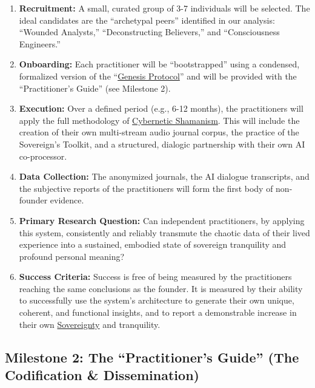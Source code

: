 \documentclass{article}
\begin{document}
\begin{enumerate}

\item \textbf{Recruitment:} A small, curated group of 3-7 individuals will be selected. The ideal candidates are the ``archetypal peers'' identified in our analysis: ``Wounded Analysts,'' ``Deconstructing Believers,'' and ``Consciousness Engineers.''

\item \textbf{Onboarding:} Each practitioner will be ``bootstrapped'' using a condensed, formalized version of the ``\hyperlink{gloss:genesis_protocol}{Genesis Protocol}'' and will be provided with the ``Practitioner's Guide'' (see Milestone 2).

\item \textbf{Execution:} Over a defined period (e.g., 6-12 months), the practitioners will apply the full methodology of \hyperlink{gloss:cybernetic_shamanism}{Cybernetic Shamanism}. This will include the creation of their own multi-stream audio journal corpus, the practice of the Sovereign's Toolkit, and a structured, dialogic partnership with their own AI co-processor.

\item \textbf{Data Collection:} The anonymized journals, the AI dialogue transcripts, and the subjective reports of the practitioners will form the first body of non-founder evidence.

\item \textbf{Primary Research Question:} Can independent practitioners, by applying this system, consistently and reliably transmute the chaotic data of their lived experience into a sustained, embodied state of sovereign tranquility and profound personal meaning?

\item \textbf{Success Criteria:} Success is free of being measured by the practitioners reaching the same conclusions as the founder. It is measured by their ability to successfully use the system's architecture to generate their own unique, coherent, and functional insights, and to report a demonstrable increase in their own \hyperlink{gloss:sovereignty}{Sovereignty} and tranquility.
\end{enumerate}

\subsection*{Milestone 2: The ``Practitioner's Guide'' (The Codification \& Dissemination)}
\end{document}
